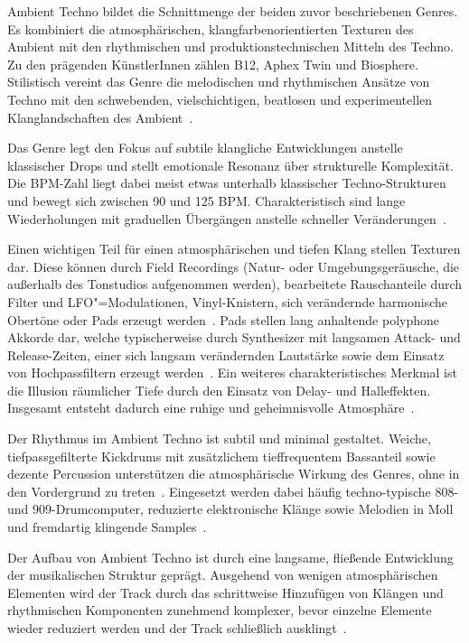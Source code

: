 \documentclass[11pt]{article}
\begin{document}
Ambient Techno bildet die Schnittmenge der beiden zuvor beschriebenen Genres. Es kombiniert die atmosphärischen, klangfarbenorientierten Texturen des Ambient mit den rhythmischen und produktionstechnischen Mitteln des Techno. Zu den prägenden KünstlerInnen zählen B12, Aphex Twin und Biosphere. Stilistisch vereint das Genre die melodischen und rhythmischen Ansätze von Techno mit den schwebenden, vielschichtigen, beatlosen und experimentellen Klanglandschaften des Ambient~\cite{AllMusicAmbientTechno}.

Das Genre legt den Fokus auf subtile klangliche Entwicklungen anstelle klassischer Drops und stellt emotionale Resonanz über strukturelle Komplexität.
Die BPM-Zahl liegt dabei meist etwas unterhalb klassischer Techno-Strukturen und bewegt sich zwischen 90 und 125 BPM. Charakteristisch sind lange Wiederholungen mit graduellen Übergängen anstelle schneller Veränderungen~\cite{SampleSound}.

Einen wichtigen Teil für einen atmosphärischen und tiefen Klang stellen Texturen dar. Diese können durch Field Recordings (Natur- oder Umgebungsgeräusche, die außerhalb des Tonstudios aufgenommen werden), bearbeitete Rauschanteile durch Filter und LFO"=Modulationen, Vinyl-Knistern, sich verändernde harmonische Obertöne oder Pads erzeugt werden~\cite{SampleSound}.
Pads stellen lang anhaltende polyphone Akkorde dar, welche typischerweise durch Synthesizer mit langsamen Attack- und Release-Zeiten, einer sich langsam verändernden Lautstärke sowie dem Einsatz von Hochpassfiltern erzeugt werden~\cite{BabyAudio, SampleSound}.
Ein weiteres charakteristisches Merkmal ist die Illusion räumlicher Tiefe durch den Einsatz von Delay- und Halleffekten. Insgesamt entsteht dadurch eine ruhige und geheimnisvolle Atmosphäre~\cite{SampleSound}.

Der Rhythmus im Ambient Techno ist subtil und minimal gestaltet. Weiche, tiefpassgefilterte Kickdrums mit zusätzlichem tieffrequentem Bassanteil sowie dezente Percussion unterstützen die atmosphärische Wirkung des Genres, ohne in den Vordergrund zu treten~\cite{SampleSound}. Eingesetzt werden dabei häufig techno-typische 808- und 909-Drumcomputer, reduzierte elektronische Klänge sowie Melodien in Moll und fremdartig klingende Samples~\cite{AllMusicAmbientTechno}.

Der Aufbau von Ambient Techno ist durch eine langsame, fließende Entwicklung der musikalischen Struktur geprägt. Ausgehend von wenigen atmosphärischen Elementen wird der Track durch das schrittweise Hinzufügen von Klängen und rhythmischen Komponenten zunehmend komplexer, bevor einzelne Elemente wieder reduziert werden und der Track schließlich ausklingt~\cite{SampleSound}.
\end{document}
